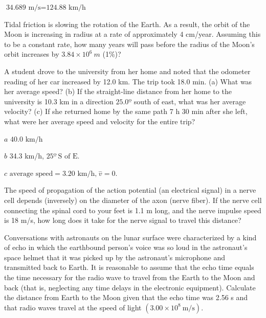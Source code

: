 \documentclass[
]{book}
\newenvironment{problems-exercises}{}{}
\begin{document}
\begin{problems-exercises}
\leavevmode\hypertarget{fs-id4081588}{}%
\(\text{34}\text{.}\text{689\ m/s} = \text{124}\text{.}\text{88\ km/h}\)

\hypertarget{fs-id951583}{}
\leavevmode\hypertarget{fs-id1535186}{}%
Tidal friction is slowing the rotation of the Earth. As a result, the
orbit of the Moon is increasing in radius at a rate of approximately 4
cm/year. Assuming this to be a constant rate, how many years will pass
before the radius of the Moon's orbit increases by
\({3\text{.}{\text{84} \times \text{10}^{6}}\ m}{}\) (1\%)?

\hypertarget{fs-id1271475}{}
\leavevmode\hypertarget{fs-id1544659}{}%
A student drove to the university from her home and noted that the
odometer reading of her car increased by 12.0 km. The trip took 18.0
min. (a) What was her average speed? (b) If the straight-line distance
from her home to the university is 10.3 km in a direction
\({\text{25}\text{.}0º}{}\) south of east, what was her average velocity?
(c) If she returned home by the same path 7 h 30 min after she left,
what were her average speed and velocity for the entire trip?

\leavevmode\hypertarget{fs-id1780671}{}%
\(a\) \({\text{40}\text{.}\text{0\ km/h}}{}\)

\(b\) 34.3 km/h, \({\text{25º}\ \text{S\ of\ E}\text{.}}{}\)

\(c\)
\({{\text{average\ speed} = \text{3.20\ km/h,}\ \overset{-}{v}} = 0.}{}\)

\hypertarget{fs-id1644060}{}
\leavevmode\hypertarget{fs-id1742458}{}%
The speed of propagation of the action potential (an electrical signal)
in a nerve cell depends (inversely) on the diameter of the axon (nerve
fiber). If the nerve cell connecting the spinal cord to your feet is 1.1
m long, and the nerve impulse speed is 18 m/s, how long does it take for
the nerve signal to travel this distance?

\hypertarget{fs-id1638875}{}
\leavevmode\hypertarget{fs-id2015498}{}%
Conversations with astronauts on the lunar surface were characterized by
a kind of echo in which the earthbound person's voice was so loud in
the astronaut's space helmet that it was picked up by the astronaut's
microphone and transmitted back to Earth. It is reasonable to assume
that the echo time equals the time necessary for the radio wave to
travel from the Earth to the Moon and back (that is, neglecting any time
delays in the electronic equipment). Calculate the distance from Earth
to the Moon given that the echo time was 2.56 s and that radio waves
travel at the speed of light
\((3\text{.}{\text{00} \times \text{10}^{8}\ }\text{m/s})\).


\end{problems-exercises}
\end{document}
